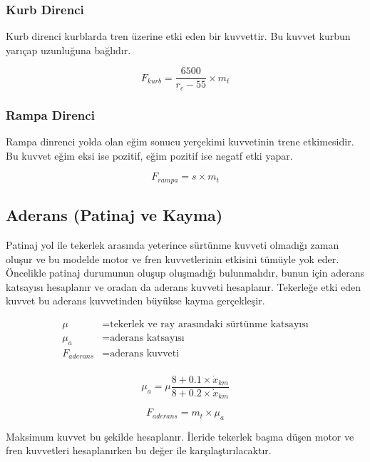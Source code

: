 \documentclass[10pt,a4paper]{article}
\begin{document}
\subsubsection{Kurb Direnci}
Kurb direnci kurblarda tren üzerine etki eden bir kuvvettir. Bu kuvvet kurbun yarıçap uzunluğuna bağlıdır.

\begin{equation}
F_{kurb} = \dfrac{6500}{r_c - 55} \times m_t
\end{equation}

\subsubsection{Rampa Direnci}
Rampa dinrenci yolda olan eğim sonucu yerçekimi kuvvetinin trene etkimesidir. Bu kuvvet eğim eksi ise pozitif, eğim pozitif ise negatf etki yapar.

\begin{equation}
F_{rampa} = s \times m_t
\end{equation}

\subsection{Aderans (Patinaj ve Kayma)}
Patinaj yol ile tekerlek arasında yeterince sürtünme kuvveti olmadığı zaman oluşur ve bu modelde motor ve fren kuvvetlerinin etkisini tümüyle yok eder. Öncelikle patinaj durumunun oluşup oluşmadığı bulunmalıdır, bunun için aderans katsayısı hesaplanır ve oradan da aderans kuvveti hesaplanır. Tekerleğe etki eden kuvvet bu aderans kuvvetinden büyükse kayma gerçekleşir. 

\begin{align}
\mu &= \text{tekerlek ve ray arasındaki sürtünme katsayısı} \nonumber \\
\mu_a &= \text{aderans katsayısı} \nonumber \\
F_{aderans} &= \text{aderans kuvveti} \nonumber \\ 
\end{align}

\begin{equation}
\mu_a = \mu \dfrac{8+0.1 \times \dot{x}_{km}}{8+0.2 \times \dot{x}_{km}}
\end{equation}

\begin{equation}
F_{aderans} = m_t\times \mu_a
\end{equation}

Maksimum kuvvet bu şekilde hesaplanır. İleride tekerlek başına düşen motor ve fren kuvvetleri hesaplanırken bu değer ile karşılaştırılacaktır.
\end{document}
